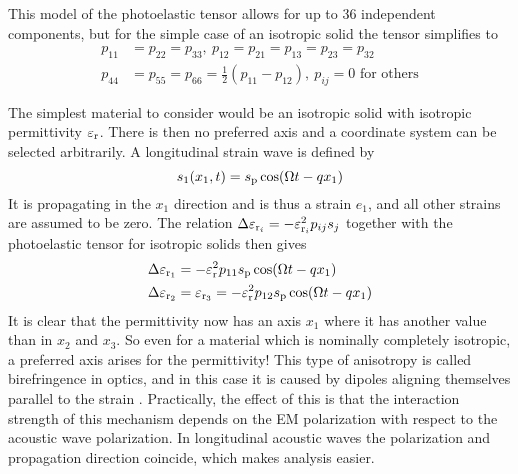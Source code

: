 \documentclass[11pt,twoside]{eitExjobb}
\begin{document}
	This model of the photoelastic tensor allows for up to 36 independent components, but for the simple case of an isotropic solid the tensor simplifies to \cite{Korpel1988}
	\begin{equation*}
	\begin{split}
		p_{11} &= p_{22} = p_{33}, \ p_{12} = p_{21} = p_{13} = p_{23} = p_{32}\\
		p_{44} &= p_{55} = p_{66} = \frac{1}{2} (p_{11} - p_{12}), \ p_{ij} = 0 \text{ for others}
	\end{split}
	\end{equation*}
	
	The simplest material to consider would be an isotropic solid with isotropic permittivity $\varepsilon_{\mathrm{r}}$. There is then no preferred axis and a coordinate system can be selected arbitrarily. A longitudinal strain wave is defined by \begin{equation*}
		s_1(x_1,t) = s_{\mathrm{p}} \cos(\Omega t - qx_1)
	\end{equation*}
	It is propagating in the $x_1$ direction and is thus a strain $e_1$, and all other strains are assumed to be zero. The relation $\Delta \varepsilon_{\mathrm{r}_i} = -\varepsilon_{\mathrm{r}_i}^2 p_{ij} s_j$ together with the photoelastic tensor for isotropic solids then gives
	\begin{align*}
		\Delta \varepsilon_{\mathrm{r}_1} &= -\varepsilon_{\mathrm{r}}^2 p_{11} s_{\mathrm{p}} \cos(\Omega t - qx_1)\\
		\Delta \varepsilon_{\mathrm{r}_2} &= \varepsilon_{\mathrm{r}_3} = -\varepsilon_{\mathrm{r}}^2 p_{12} s_{\mathrm{p}} \cos(\Omega t - qx_1)
	\end{align*}
	It is clear that the permittivity now has an axis $x_1$ where it has another value than in $x_2$ and $x_3$. So even for a material which is nominally completely isotropic, a preferred axis arises for the permittivity! This type of anisotropy is called birefringence in optics, and in this case it is caused by dipoles aligning themselves parallel to the strain \cite{Korpel1988}. Practically, the effect of this is that the interaction strength of this mechanism depends on the EM polarization with respect to the acoustic wave polarization. In longitudinal acoustic waves the polarization and propagation direction coincide, which makes analysis easier.
	
\end{document}
